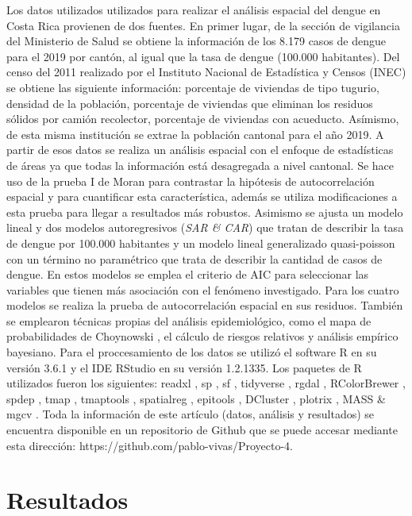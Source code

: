 \documentclass[12pt,a4paper]{article}
\begin{document}
Los datos utilizados utilizados para realizar el análisis espacial del dengue en Costa Rica provienen de dos fuentes. En primer lugar, de la sección de vigilancia del Ministerio de Salud se obtiene la información de los 8.179 casos de dengue para el 2019 por cantón, al igual que la tasa de dengue (100.000 habitantes). Del censo del 2011 realizado por el Instituto Nacional de Estadística y Censos (INEC) se obtiene las siguiente información: porcentaje de viviendas de tipo tugurio, densidad de la población, porcentaje de viviendas que eliminan los residuos sólidos por camión recolector, porcentaje de viviendas con acueducto. Asímismo, de esta misma institución se extrae la población cantonal para el año 2019.
\newpage
A partir de esos datos se realiza un análisis espacial con el enfoque de estadísticas de áreas ya que todas la información está desagregada a nivel cantonal. Se hace uso de la prueba I de Moran para contrastar la hipótesis de autocorrelación espacial y para cuantificar esta característica, además se utiliza modificaciones a esta prueba para llegar a resultados más robustos. Asimismo se ajusta un modelo lineal y dos modelos autoregresivos (\textit{SAR \& CAR}) que tratan de describir la tasa de dengue por 100.000 habitantes y un modelo lineal generalizado quasi-poisson con un término no paramétrico que trata de describir la cantidad de casos de dengue. En estos modelos se emplea el criterio de AIC para seleccionar las variables que tienen más asociación con el fenómeno investigado. Para los cuatro modelos se realiza la prueba de autocorrelación espacial en sus residuos. También se emplearon técnicas propias del análisis epidemiológico, como el mapa de probabilidades de Choynowski \cite{Choynowski1959}, el cálculo de riesgos relativos y análisis empírico bayesiano.
\newline
Para el proccesamiento de los datos se utilizó el software R \cite{R} en su versión 3.6.1 y el IDE RStudio en su versión 1.2.1335. Los paquetes de R utilizados fueron los siguientes: readxl \cite{readxl}, sp \cite{sp}, sf \cite{sf}, tidyverse \cite{tidy}, rgdal \cite{rdal}, RColorBrewer \cite{Rcolor}, spdep \cite{sp}, tmap \cite{tmap}, tmaptools \cite{tmaptools}, spatialreg \cite{sp}, epitools \cite{epitools}, DCluster \cite{dcluster}, plotrix \cite{plotrix}, MASS \cite{MASS} \& mgcv \cite{mgcv}. Toda la información de este artículo (datos, análisis y resultados) se encuentra disponible en un repositorio de Github que se puede accesar mediante esta dirección: https://github.com/pablo-vivas/Proyecto-4.
\section{Resultados}
\end{document}
